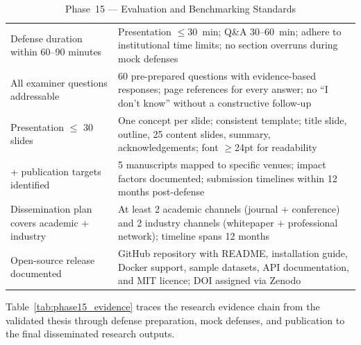 \begingroup\singlespacing\tablefontsize\tablestripes
\begin{xltabular}{\textwidth}{@{} X X @{}}
\caption{Phase~15 --- Evaluation and Benchmarking Standards}
\label{tab:phase15_benchmark}\\
\toprule
{} &  \\
\midrule
\endfirsthead
\endhead
\bottomrule
\endlastfoot
Defense duration within 60--90 minutes          & Presentation $\leq$30~min; Q\&A 30--60~min; adhere to institutional time limits; no section overruns during mock defenses \\
\addlinespace
All examiner questions addressable              & 60 pre-prepared questions with evidence-based responses; page references for every answer; no ``I don't know'' without a constructive follow-up \\
\addlinespace
Presentation $\leq$ 30 slides                   & One concept per slide; consistent template; title slide, outline, 25 content slides, summary, acknowledgements; font $\geq$24pt for readability \\
+ publication targets identified               & 5 manuscripts mapped to specific venues; impact factors documented; submission timelines within 12 months post-defense \\
\addlinespace
Dissemination plan covers academic + industry   & At least 2 academic channels (journal + conference) and 2 industry channels (whitepaper + professional network); timeline spans 12 months \\
\addlinespace
Open-source release documented                  & GitHub repository with README, installation guide, Docker support, sample datasets, API documentation, and MIT licence; DOI assigned via Zenodo \\
\end{xltabular}
\endgroup

\vspace{1.5em}

Table~\ref{tab:phase15_evidence} traces the research evidence chain from the validated thesis through defense preparation, mock defenses, and publication to the final disseminated research outputs.

